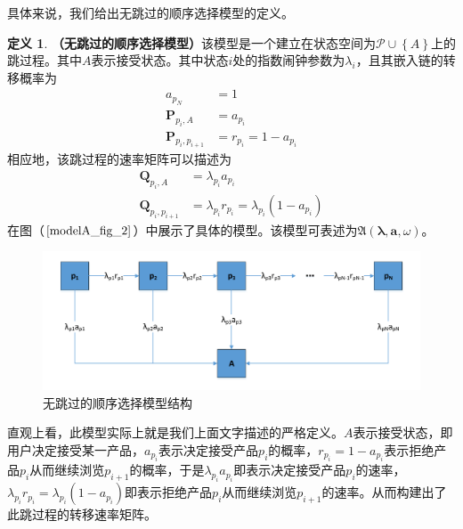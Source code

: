 \documentclass[UTF8]{ctexart}
\theoremstyle{plain}
\theoremstyle{definition}
\newtheorem{defn}{定义}[section]
\theoremstyle{remark}
\begin{document}
	具体来说，我们给出无跳过的顺序选择模型的定义。
	\begin{defn}\textbf{（无跳过的顺序选择模型）}该模型是一个建立在状态空间为$\mathcal{P} \cup \left\{A\right\}$上的跳过程。其中$A$表示接受状态。其中状态$i$处的指数闹钟参数为$\lambda_i$，且其嵌入链的转移概率为
	\begin{equation}
	\begin{aligned}
	a_{p_N} & = 1 \\
	\bm{P}_{p_i,A}  & = a_{p_i}  \\
	\bm{P}_{p_i,p_{i+1}} & = r_{p_i} = 1 - a_{p_i}
	\end{aligned}
	\end{equation}
	相应地，该跳过程的速率矩阵可以描述为
	\begin{equation}
	\begin{aligned}
	\bm{Q}_{p_i,A} & = \lambda_{p_i} a_{p_i} \\
	\bm{Q}_{p_i,p_{i+1}} & = \lambda_{p_i} r_{p_i} = \lambda_{p_i} ( 1 - a_{p_i})
	\end{aligned}
	\end{equation}
	在图（$\ref{modelA_fig_2}$）中展示了具体的模型。该模型可表述为$\mathfrak{A}\left(\bm{\lambda}, \bm{a}, \omega\right)$。
	\end{defn}
	\begin{figure}[h!]
		\centering
		\includegraphics[width = 12cm]{modelA_fig_2.pdf}
		\caption{无跳过的顺序选择模型结构}\label{modelA_fig_2}
	\end{figure}
	直观上看，此模型实际上就是我们上面文字描述的严格定义。$A$表示接受状态，即用户决定接受某一产品，$a_{p_i}$表示决定接受产品$p_i$的概率，$r_{p_i} = 1 - a_{p_i}$表示拒绝产品$p_i$从而继续浏览$p_{i+1}$的概率，于是$\lambda_{p_i} a_{p_i}$即表示决定接受产品$p_i$的速率，$\lambda_{p_i} r_{p_i} = \lambda_{p_i} (1 - a_{p_i})$即表示拒绝产品$p_i$从而继续浏览$p_{i+1}$的速率。从而构建出了此跳过程的转移速率矩阵。
\end{document}
